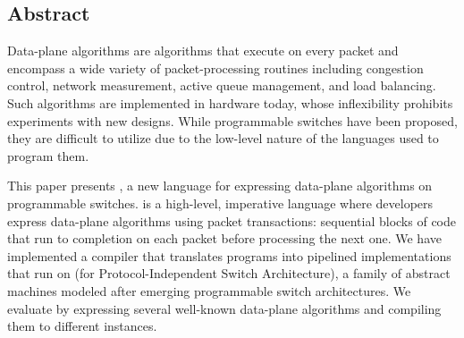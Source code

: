 \subsection*{Abstract}

Data-plane algorithms are algorithms that execute on every packet and encompass
a wide variety of packet-processing routines including congestion control,
network measurement, active queue management, and load balancing. Such 
algorithms are implemented in hardware today, whose inflexibility prohibits
experiments with new designs. While programmable switches have been proposed, 
they are difficult to utilize due to the low-level nature of the languages
used to program them.

This paper presents \pktlanguage, a new language for expressing data-plane
algorithms on programmable switches. \pktlanguage is a high-level, imperative
language where developers express data-plane algorithms using packet
transactions: sequential blocks of code that run to completion on each packet
before processing the next one. We have implemented a compiler that translates
\pktlanguage programs into pipelined implementations that run on \absmachine
(for Protocol-Independent Switch Architecture), a family of abstract machines
modeled after emerging programmable switch architectures. We evaluate
\pktlanguage by expressing several well-known data-plane algorithms and
compiling them to different \absmachine instances.
